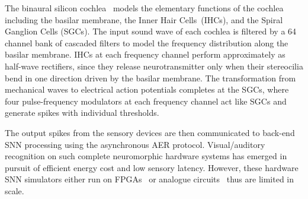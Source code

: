 The binaural silicon cochlea~\citep{5537164} models the elementary functions of the cochlea including the basilar membrane, the Inner Hair Cells~(IHCs), and the Spiral Ganglion Cells (SGCs).
The input sound wave of each cochlea is filtered by a 64 channel bank of cascaded filters to model the frequency distribution along the basilar membrane.
IHCs \DIFdelbegin {}\DIFdelend \DIFaddbegin {}\DIFaddend at each frequency channel perform approximately as half-wave rectifiers, since they release neurotransmitter only when their stereocilia bend in one direction driven by the basilar membrane.
The transformation from mechanical waves to electrical action potentials completes at the SGCs, where four pulse-frequency modulators at each frequency channel act like SGCs and generate spikes with individual thresholds.


The output spikes from the sensory devices are then communicated to back-end SNN processing using the asynchronous AER protocol.
Visual/auditory recognition on such complete neuromorphic hardware systems has emerged in pursuit of efficient energy cost and low sensory latency.
However, these hardware SNN simulators either run on FPGAs~\citep{neil2014minitaur, kiselev2016event} or analogue circuits~\citep{qiao2015reconfigurable} thus are limited in scale.

